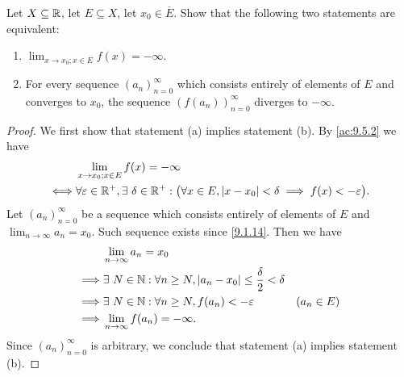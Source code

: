 \begin{ac}\label{ac:9.5.4}
  Let \(X \subseteq \mathbb{R}\), let \(E \subseteq X\), let \(x_0 \in \overline{E}\).
  Show that the following two statements are equivalent:
  \begin{enumerate}
    \item \(\lim_{x \to x_0 ; x \in E} f(x) = -\infty\).
    \item For every sequence \((a_n)_{n = 0}^\infty\) which consists entirely of elements of \(E\) and converges to \(x_0\), the sequence \((f(a_n))_{n = 0}^\infty\) diverges to \(-\infty\).
  \end{enumerate}
\end{ac}

\begin{proof}
  We first show that statement (a) implies statement (b).
  By \cref{ac:9.5.2} we have
  \begin{align*}
         & \lim_{x \to x_0 ; x \in E} f(x) = -\infty                                                                                                \\
    \iff & \forall \varepsilon \in \mathbb{R}^+, \exists\ \delta \in \mathbb{R}^+ : \big(\forall x \in E, \left\lvert x - x_0\right\rvert < \delta \implies f(x) < -\varepsilon\big).
  \end{align*}
  Let \((a_n)_{n = 0}^\infty\) be a sequence which consists entirely of elements of \(E\) and \(\lim_{n \to \infty} a_n = x_0\).
  Such sequence exists since \cref{9.1.14}.
  Then we have
  \begin{align*}
             & \lim_{n \to \infty} a_n = x_0                                                                      \\
    \implies & \exists\ N \in \mathbb{N} : \forall n \geq N, \left\lvert a_n - x_0\right\rvert \leq \frac{\delta}{2} < \delta               \\
    \implies & \exists\ N \in \mathbb{N} : \forall n \geq N, f(a_n) < -\varepsilon                          & (a_n \in E) \\
    \implies & \lim_{n \to \infty} f(a_n) = -\infty.
  \end{align*}
  Since \((a_n)_{n = 0}^\infty\) is arbitrary, we conclude that statement (a) implies statement (b).


\end{proof}
